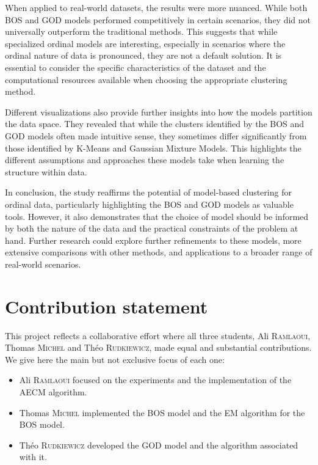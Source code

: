 \documentclass[a4paper,12pt]{article}
\begin{document}
When applied to real-world datasets, the results were more nuanced. While both BOS and GOD models performed competitively in certain scenarios, they did not universally outperform the traditional methods. This suggests that while specialized ordinal models are interesting, especially in scenarios where the ordinal nature of data is pronounced, they are not a default solution. It is essential to consider the specific characteristics of the dataset and the computational resources available when choosing the appropriate clustering method.

Different visualizations also provide further insights into how the models partition the data space. They revealed that while the clusters identified by the BOS and GOD models often made intuitive sense, they sometimes differ significantly from those identified by K-Means and Gaussian Mixture Models. This highlights the different assumptions and approaches these models take when learning the structure within data.

In conclusion, the study reaffirms the potential of model-based clustering for ordinal data, particularly highlighting the BOS and GOD models as valuable tools. However, it also demonstrates that the choice of model should be informed by both the nature of the data and the practical constraints of the problem at hand. Further research could explore further refinements to these models, more extensive comparisons with other methods, and applications to a broader range of real-world scenarios.

\section{Contribution statement}
This project reflects a collaborative effort where all three students, Ali \textsc{Ramlaoui}, Thomas \textsc{Michel} and Théo \textsc{Rudkiewicz}, made equal and substantial contributions. 
We give here the main but not exclusive focus of each one:
\begin{itemize}
    \item Ali \textsc{Ramlaoui} focused on the experiments and the implementation of the AECM algorithm.
    \item Thomas \textsc{Michel} implemented the BOS model and the EM algorithm for the BOS model.
    \item Théo \textsc{Rudkiewicz} developed the GOD model and the algorithm associated with it.
\end{itemize}


\end{document}
